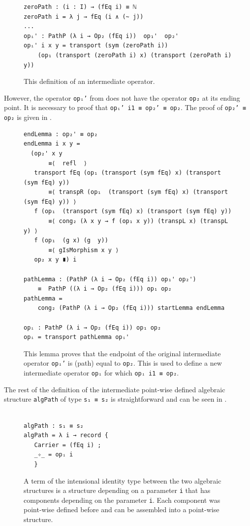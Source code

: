 \documentclass[12pt,a4paper,twoside,xetex]{book} %
\begin{document}
\begin{figure}\label{zeroPathLift}
\centering 
\begin{BVerbatim}
zeroPath : (i : I) → (fEq i) ≡ ℕ
zeroPath i = λ j → fEq (i ∧ (~ j))
...
opᵢ' : PathP (λ i → Op₂ (fEq i))  op₁'  op₂'
opᵢ' i x y = transport (sym (zeroPath i))
    (op₁ (transport (zeroPath i) x) (transport (zeroPath i) y))
\end{BVerbatim}
\caption{This definition of an intermediate operator.}

\end{figure}

However, the operator \texttt{opᵢ'} from  does not have the operator \texttt{op₂} at its ending point. It is necessary to proof
that  \texttt{opᵢ' i1 ≡ op₂' ≡ op₂}. The proof of \texttt{op₂' ≡ op₂} is given in .

\begin{figure}\label{adaptedOp}
 \centering
\begin{BVerbatim}
endLemma : op₂' ≡ op₂
endLemma i x y =
  (op₂' x y
       ≡⟨  refl  ⟩
   transport fEq (op₁ (transport (sym fEq) x) (transport (sym fEq) y))
       ≡⟨ transpR (op₁  (transport (sym fEq) x) (transport (sym fEq) y)) ⟩
   f (op₁  (transport (sym fEq) x) (transport (sym fEq) y))
       ≡⟨ cong₂ (λ x y → f (op₁ x y)) (transpL x) (transpL y) ⟩
   f (op₁  (g x) (g  y))
       ≡⟨ gIsMorphism x y ⟩
   op₂ x y ∎) i

pathLemma : (PathP (λ i → Op₂ (fEq i)) op₁' op₂') 
    ≡  PathP ((λ i → Op₂ (fEq i))) op₁ op₂
pathLemma = 
    cong₂ (PathP (λ i → Op₂ (fEq i))) startLemma endLemma

opᵢ : PathP (λ i → Op₂ (fEq i)) op₁ op₂
opᵢ = transport pathLemma opᵢ'
\end{BVerbatim}

\caption{This lemma proves that the endpoint of the original 
intermediate operator \texttt{opᵢ'} is (path) equal to
\texttt{op₂}. This is used to define a new intermediate operator 
\texttt{opᵢ} for which \texttt{opᵢ i1 ≡ op₂}.}   
\end{figure}

The rest of the definition of the intermediate point-wise defined algebraic 
structure \texttt{algPath} of type \texttt{s₁ ≡ s₂} is straightforward and can be seen in . 

\begin{figure}\label{algpath}
\centering
 \begin{BVerbatim}

algPath : s₁ ≡ s₂
algPath = λ i → record {
   Carrier = (fEq i) ;
   _✧_ = opᵢ i
   }
 \end{BVerbatim}

 \caption{A term of the intensional identity type between the two algebraic 
structures is a structure depending on a parameter \texttt{i} that has 
components depending on the parameter \texttt{i}. Each component was point-wise 
defined before and can be assembled into a point-wise structure.}
\end{figure}
\end{document}
